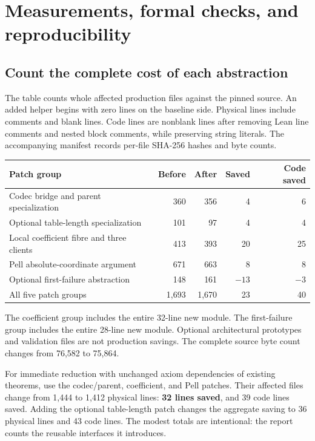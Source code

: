 \section{Measurements, formal checks, and reproducibility}
\label{sec:validation}

\subsection{Count the complete cost of each abstraction}

The table counts whole affected production files against the pinned source.
An added helper begins with zero lines on the baseline side. Physical lines
include comments and blank lines. Code lines are nonblank lines after removing
Lean line comments and nested block comments, while preserving string literals.
The accompanying manifest records per-file SHA-256 hashes and byte counts.

\begin{center}
\small
\begin{tabularx}{\textwidth}{@{}Xrrrr@{}}
\toprule
Patch group & Before & After & Saved & Code saved\\
\midrule
Codec bridge and parent specialization & 360 & 356 & 4 & 6\\
Optional table-length specialization & 101 & 97 & 4 & 4\\
Local coefficient fibre and three clients & 413 & 393 & 20 & 25\\
Pell absolute-coordinate argument & 671 & 663 & 8 & 8\\
Optional first-failure abstraction & 148 & 161 & $-13$ & $-3$\\
\midrule
All five patch groups & 1,693 & 1,670 & 23 & 40\\
\bottomrule
\end{tabularx}
\end{center}

The coefficient group includes the entire 32-line new module. The
first-failure group includes the entire 28-line new module. Optional
architectural prototypes and validation files are not production savings.
The complete source byte count changes from 76,582 to 75,864.

For immediate reduction with unchanged axiom dependencies of existing
theorems, use the codec/parent, coefficient, and Pell patches. Their affected
files change from 1,444 to 1,412 physical lines: \textbf{32 lines saved}, and
39 code lines saved. Adding the optional table-length patch changes the
aggregate saving to 36 physical lines and 43 code lines. The modest totals
are intentional: the report counts the reusable interfaces it introduces.

